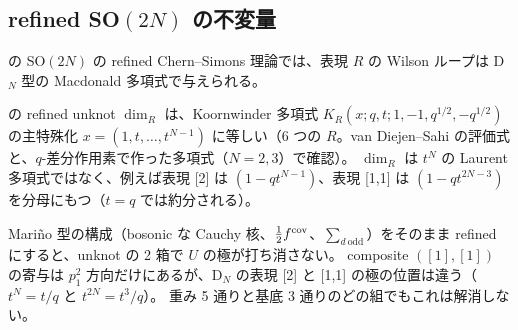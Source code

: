 \subsection{refined SO$(2N)$ の不変量}
\cite{AgSc12} の SO$(2N)$ の refined Chern--Simons 理論では、表現 $R$ の Wilson ループは D$_N$ 型の Macdonald 多項式で与えられる。
\begin{compresult}
\cite{AgSc12} の refined unknot $\dim_R$ は、Koornwinder 多項式 $K_R(x; q, t; 1, -1, q^{1/2}, -q^{1/2})$ の主特殊化 $x = (1, t, \dots, t^{N-1})$ に等しい（6 つの $R$。van Diejen--Sahi の評価式と、$q$-差分作用素で作った多項式（$N = 2, 3$）で確認）。
$\dim_R$ は $t^N$ の Laurent 多項式ではなく、例えば表現 [2] は $(1 - q t^{N-1})$、表現 [1,1] は $(1 - q t^{2N-3})$ を分母にもつ（$t = q$ では約分される）。
\end{compresult}

\begin{remark}
Mariño 型の構成（bosonic な Cauchy 核、$\tfrac12 f^{\mathrm{cov}}$、$\sum_{d\ \mathrm{odd}}$）をそのまま refined にすると、unknot の 2 箱で $U$ の極が打ち消さない。
composite $([1],[1])$ の寄与は $p_1^2$ 方向だけにあるが、D$_N$ の表現 [2] と [1,1] の極の位置は違う（$t^N = t/q$ と $t^{2N} = t^3/q$）。
重み 5 通りと基底 3 通りのどの組でもこれは解消しない。
\end{remark}

